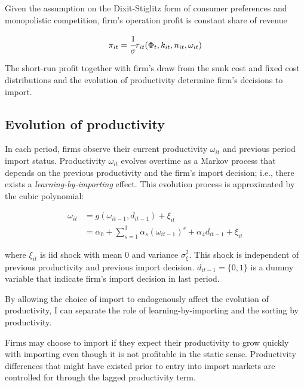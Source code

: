 \documentclass[11pt,letter]{article}
\newcommand{\mprn}[1]{\{{#1}\}}
\begin{document}
\begin{appendices}
Given the assumption on the Dixit-Stiglitz form of consumer preferences and monopolistic competition, firm's operation profit is constant share of revenue


\begin{align}
\pi_{it} = \cfrac{1}{\sigma}r_{it}(\Phi_t, k_{it},n_{it},\omega_{it})
\end{align}

The short-run profit together with firm's draw from the sunk cost and fixed cost distributions and the evolution of productivity determine firm's decisions to import.

\subsection{Evolution of productivity}

In each period, firms observe their current productivity $\omega_{it}$ and previous period import status. Productivity $\omega_{it}$ evolves overtime as a Markov process that depends on the previous productivity and the firm's import decision; i.e., there exists a \textit{learning-by-importing} effect. This evolution process is approximated by the cubic polynomial:

\begin{align}
\omega_{it} &= g(\omega_{it-1},d_{it-1})+ \xi_{it}\nonumber \\
&= \alpha_0 + \sum_{s=1}^3 \alpha_s(\omega_{it-1})^s + \alpha_4 d_{it-1} + \xi_{it} \label{prodevol}
\end{align}

\noindent where $\xi_{it}$ is iid shock with mean 0 and variance $\sigma_{\xi}^2$. This shock is independent of previous productivity and previous import decision. $d_{it-1}=\mprn{0,1}$ is a dummy variable that indicate firm's import decision in last period.

By allowing the choice of import to endogenously affect the evolution of productivity, I can separate the role of learning-by-importing and the sorting by productivity.

Firms may choose to import if they expect their productivity to grow quickly with importing even though it is not profitable in the static sense. Productivity differences that might have existed prior to entry into import markets are controlled for through the lagged productivity term.



\end{appendices}
\end{document}
